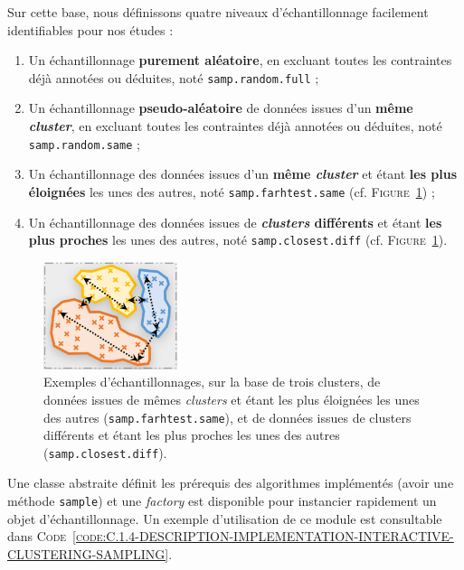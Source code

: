 	Sur cette base, nous définissons quatre niveaux d'échantillonnage facilement identifiables pour nos études :
	\begin{enumerate}
		\item Un échantillonnage \textbf{purement aléatoire}, en excluant toutes les contraintes déjà annotées ou déduites, noté \texttt{samp.random.full} ;
		\item Un échantillonnage \textbf{pseudo-aléatoire} de données issues d'un \textbf{même \textit{cluster}}, en excluant toutes les contraintes déjà annotées ou déduites, noté \texttt{samp.random.same} ;
		\item Un échantillonnage des données issues d'un \textbf{même \textit{cluster}} et étant \textbf{les plus éloignées} les unes des autres, noté \texttt{samp.farhtest.same} (cf. \textsc{Figure~\ref{figure:C.1.4-DESCRIPTION-IMPLEMENTATION-INTERACTIVE-CLUSTERING-CONTRAINTES-SAMPLING}}) ;
		\item Un échantillonnage des données issues de \textbf{\textit{clusters} différents} et étant \textbf{les plus proches} les unes des autres, noté \texttt{samp.closest.diff} (cf. \textsc{Figure~\ref{figure:C.1.4-DESCRIPTION-IMPLEMENTATION-INTERACTIVE-CLUSTERING-CONTRAINTES-SAMPLING}}).
	\end{enumerate}
	
	\begin{figure}[!htb]
		\centering
		\includegraphics[width=0.35\textwidth]{figures/example-sampling}
		\caption{
			Exemples d'échantillonnages, sur la base de trois clusters, de données issues de mêmes \textit{clusters} et étant les plus éloignées les unes des autres (\texttt{samp.farhtest.same}), et de données issues de clusters différents et étant les plus proches les unes des autres (\texttt{samp.closest.diff}).
		}
		\label{figure:C.1.4-DESCRIPTION-IMPLEMENTATION-INTERACTIVE-CLUSTERING-CONTRAINTES-SAMPLING}
	\end{figure}

	Une classe abstraite définit les prérequis des algorithmes implémentés (avoir une méthode \texttt{sample}) et une \textit{factory} est disponible pour instancier rapidement un objet d'échantillonnage.
	Un exemple d'utilisation de ce module est consultable dans \textsc{Code~\ref{code:C.1.4-DESCRIPTION-IMPLEMENTATION-INTERACTIVE-CLUSTERING-SAMPLING}}.
	
